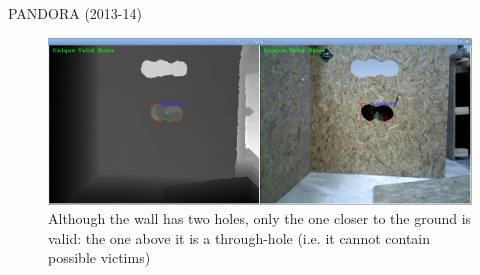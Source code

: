\begin{frame}{\small PANDORA (2013-14)}

\begin{figure}[H]\centering
  \includegraphics[scale=0.3]{figures/02/unique_holes.png}
  \caption{Although the wall has two holes, only the one closer to the
           ground is valid: the one above it is a through-hole (i.e.
           it cannot contain possible victims)}
  \label{fig:holes}
\end{figure}

\end{frame}
